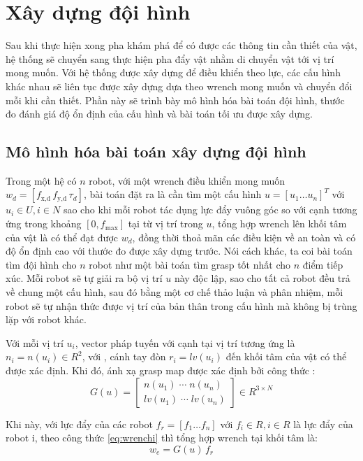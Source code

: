 \section{Xây dựng đội hình}
Sau khi thực hiện xong pha khám phá để có được các thông tin cần thiết của vật, hệ thống sẽ chuyển sang thực hiện pha đẩy vật nhằm di chuyển vật tới vị trí mong muốn. Với hệ thống được xây dựng để điều khiển theo lực, các cấu hình khác nhau sẽ liên tục được xây dựng dựa theo wrench mong muốn và chuyển đổi mỗi khi cần thiết. Phần này sẽ trình bày mô hình hóa bài toán đội hình, thước đo đánh giá độ ổn định của cấu hình và bài toán tối ưu được xây dựng.
\subsection{Mô hình hóa bài toán xây dựng đội hình}
Trong một hệ có $n$ robot, với một wrench điều khiển mong muốn $w_d = [f_{\text{x,d}} \, f_{\text{y,d}} \, \tau_d ]$, bài toán đặt ra là cần tìm một cấu hình $u = [u_1 \ldots u_n]^T$ với $u_i \in U, i \in N$ sao cho khi mỗi robot tác dụng lực đẩy vuông góc so với cạnh tương ứng trong khoảng $[0, f_{\text{max}}]$ tại từ vị trí trong $u$, tổng hợp wrench lên khối tâm của vật là có thể đạt được $w_d$, đồng thời thoả mãn các điều kiện về an toàn và có độ ổn định cao với thước đo được xây dựng trước. Nói cách khác, ta coi bài toán tìm đội hình cho $n$ robot như một bài toán tìm grasp tốt nhất cho $n$ điểm tiếp xúc. Mỗi robot sẽ tự giải ra bộ vị trí $u$ này độc lập, sao cho tất cả robot đều trả về chung một cấu hình, sau đó bằng một cơ chế thảo luận và phân nhiệm, mỗi robot sẽ tự nhận thức được vị trí của bản thân trong cấu hình mà không bị trùng lặp với robot khác.

Với mỗi vị trí $u_i$, vector pháp tuyến với cạnh tại vị trí tương ứng là $n_i = n(u_i) \in R^2$, với , cánh tay đòn $r_i = lv(u_i)$ đến khối tâm của vật có thể được xác định. Khi đó, ánh xạ grasp map được xác định bởi công thức :
\begin{equation}
    G(u) =
    \begin{bmatrix} n(u_1)\; \cdots\; n(u_n) \\
        lv(u_1)\; \cdots\; lv(u_n)
    \end{bmatrix}
    \in R^{3 \times N}
\label{eq:gmap2}
\end{equation}

Khi này, với lực đẩy của các robot $f_r = [f_1 \ldots f_n]$ với $f_i \in R, i \in R$ là lực đẩy của robot i, theo công thức \ref{eq:wrenchi} thì tổng hợp wrench tại khối tâm là:
\begin{equation}
    w_e = G(u)\,f_r
\label{eq:we}
\end{equation}


